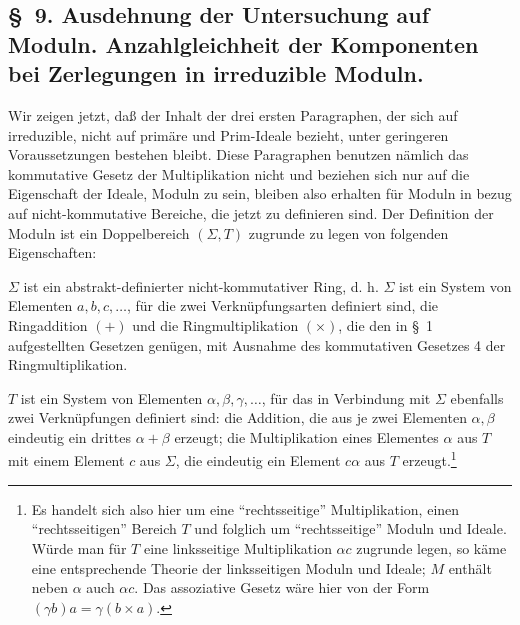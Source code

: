 \documentclass[11pt]{article}
\begin{document}
\subsection*{\S~9. Ausdehnung der Untersuchung auf Moduln. Anzahlgleichheit der Komponenten bei Zerlegungen in irreduzible Moduln.}

Wir zeigen jetzt, daß der Inhalt der drei ersten Paragraphen, der sich auf irreduzible, nicht auf primäre und Prim-Ideale bezieht, unter geringeren Voraussetzungen bestehen bleibt. Diese Paragraphen benutzen nämlich das kommutative Gesetz der Multiplikation nicht und beziehen sich nur auf die Eigenschaft der Ideale, Moduln zu sein, bleiben also erhalten für Moduln in bezug auf nicht-kommutative Bereiche, die jetzt zu definieren sind. Der Definition der Moduln ist ein Doppelbereich $(\Sigma,T)$ zugrunde zu legen von folgenden Eigenschaften:

$\Sigma$ ist ein abstrakt-definierter nicht-kommutativer Ring, d. h. $\Sigma$ ist ein System von Elementen $a,b,c,\ldots$, für die zwei Verknüpfungsarten definiert sind, die Ringaddition $(+)$ und die Ringmultiplikation $(\times)$, die den in \S~1 aufgestellten Gesetzen genügen, mit Ausnahme des kommutativen Gesetzes 4 der Ringmultiplikation.

$T$ ist ein System von Elementen $\alpha,\beta,\gamma,\ldots$, für das in Verbindung mit $\Sigma$ ebenfalls zwei Verknüpfungen definiert sind: die Addition, die aus je zwei Elementen $\alpha,\beta$ eindeutig ein drittes $\alpha+\beta$ erzeugt; die Multiplikation eines Elementes $\alpha$ aus $T$ mit einem Element $c$ aus $\Sigma$, die eindeutig ein Element $c\alpha$ aus $T$ erzeugt.\footnote{Es handelt sich also hier um eine ``rechtsseitige'' Multiplikation, einen ``rechtsseitigen'' Bereich $T$ und folglich um ``rechtsseitige'' Moduln und Ideale. Würde man für $T$ eine linksseitige Multiplikation $\alpha c$ zugrunde legen, so käme eine entsprechende Theorie der linksseitigen Moduln und Ideale; $M$ enthält neben $\alpha$ auch $\alpha c$. Das assoziative Gesetz wäre hier von der Form $(\gamma b)a=\gamma(b\times a)$.}
\end{document}
